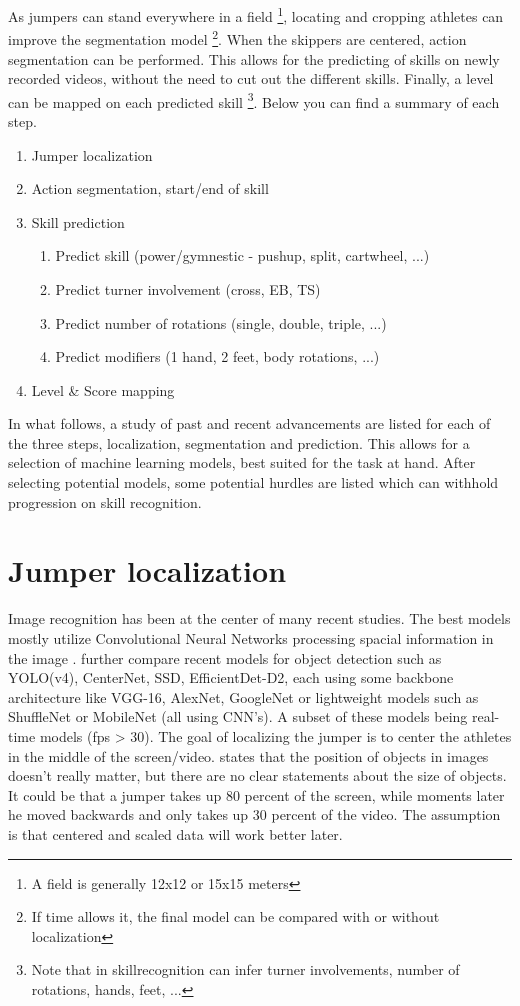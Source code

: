 As jumpers can stand everywhere in a field \footnote{A field is generally 12x12 or 15x15 meters}, locating and cropping athletes can improve the segmentation model \footnote{If time allows it, the final model can be compared with or without localization}. When the skippers are centered, action segmentation can be performed. This allows for the predicting of skills on newly recorded videos, without the need to cut out the different skills. Finally, a level can be mapped on each predicted skill \footnote{Note that in skillrecognition can infer turner involvements, number of rotations, hands, feet, ...}. Below you can find a summary of each step.

\begin{enumerate}
    \item Jumper localization
    \item Action segmentation, start/end of skill
    \item Skill prediction
    \begin{enumerate}
        \item Predict skill (power/gymnestic - pushup, split, cartwheel, ...)
        \item Predict turner involvement (cross, EB, TS)
        \item Predict number of rotations (single, double, triple, ...)
        \item Predict modifiers (1 hand, 2 feet, body rotations, ...)
    \end{enumerate}
    \item Level \& Score mapping
\end{enumerate}

In what follows, a study of past and recent advancements are listed for each of the three steps, localization, segmentation and prediction. This allows for a selection of machine learning models, best suited for the task at hand. After selecting potential models, some potential hurdles are listed which can withhold progression on skill recognition.

\section{Jumper localization}
\label{lit:jumper-localization}

Image recognition has been at the center of many recent studies. The best models mostly utilize Convolutional Neural Networks processing spacial information in the image \autocite{Zaidi_2021}. \textcite{Zaidi_2021} further compare recent models for object detection such as YOLO(v4), CenterNet, SSD, EfficientDet-D2, each using some backbone architecture like VGG-16, AlexNet, GoogleNet or lightweight models such as ShuffleNet or MobileNet (all using CNN's). A subset of these models being real-time models (fps > 30).
The goal of localizing the jumper is to center the athletes in the middle of the screen/video. \textcite{Bharadiya_2023} states that the position of objects in images doesn't really matter, but there are no clear statements about the size of objects. It could be that a jumper takes up 80 percent of the screen, while moments later he moved backwards and only takes up 30 percent of the video. The assumption is that centered and scaled data will work better later.

